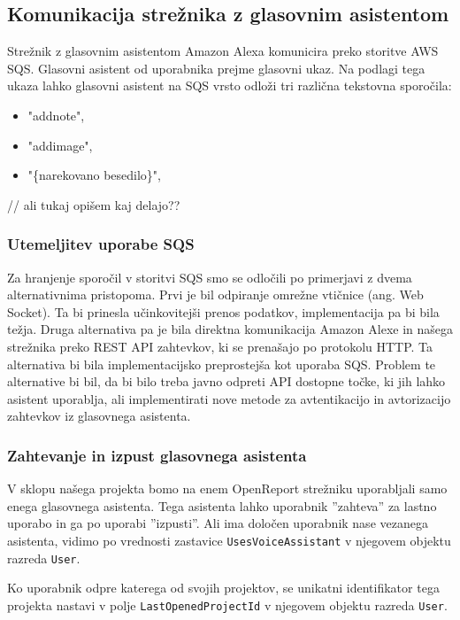 \documentclass[a4paper, 12pt]{book}
\begin{document}
\subsection{Komunikacija strežnika z glasovnim asistentom}

Strežnik z glasovnim asistentom Amazon Alexa komunicira preko storitve AWS SQS.
Glasovni asistent od uporabnika prejme glasovni ukaz.
Na podlagi tega ukaza lahko glasovni asistent na SQS vrsto odloži tri različna tekstovna sporočila:
\begin{itemize}
	\item "addnote",
	\item "addimage",
	\item "\{narekovano besedilo\}",
\end{itemize}

// ali tukaj opišem kaj delajo??

\subsubsection{Utemeljitev uporabe SQS}
Za hranjenje sporočil v storitvi SQS smo se odločili po primerjavi z dvema alternativnima pristopoma.
Prvi je bil odpiranje omrežne vtičnice (ang. Web Socket).
Ta bi prinesla učinkovitejši prenos podatkov, implementacija pa bi bila težja.
Druga alternativa pa je bila direktna komunikacija Amazon Alexe in našega strežnika preko REST API zahtevkov, ki se prenašajo po protokolu HTTP.
Ta alternativa bi bila implementacijsko preprostejša kot uporaba SQS.
Problem te alternative bi bil, da bi bilo treba javno odpreti API dostopne točke, ki jih lahko asistent uporablja, ali implementirati nove metode za avtentikacijo in avtorizacijo zahtevkov iz glasovnega asistenta.

\subsubsection{Zahtevanje in izpust glasovnega asistenta}

V sklopu našega projekta bomo na enem OpenReport strežniku uporabljali samo enega glasovnega asistenta.
Tega asistenta lahko uporabnik ''zahteva'' za lastno uporabo in ga po uporabi ''izpusti''.
Ali ima določen uporabnik nase vezanega asistenta, vidimo po vrednosti zastavice \texttt{UsesVoiceAssistant} v njegovem objektu razreda \texttt{User}.

Ko uporabnik odpre katerega od svojih projektov, se unikatni identifikator tega projekta nastavi v polje \texttt{LastOpenedProjectId} v njegovem objektu razreda \texttt{User}.
\end{document}
